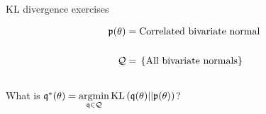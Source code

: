 
\newcommand{\TikzPtheta}[2]{
\draw[#1] (4.5, 3)  node[anchor=north] {#2};
\begin{scope}[shift={(2.5,2.5)}]
    \begin{scope}[rotate=45]
        \begin{scope}[shift={(-2.5,-2.5)}]
            \foreach \s in {0.2, 0.4, 0.6, 0.8, 1.0}
            \draw[#1] (2.5,2.5) ellipse (\s * 3 and \s * 1);
        \end{scope}
    \end{scope}
\end{scope}
}


\newcommand{\TikzPlotArea}{
\draw (0,0)--(5,0);
\foreach \x in {0,...,5}
  \draw (\x,0)--(\x,-.1) node[anchor=north]{};

\draw (0,0)--(0,5);
\foreach \y in {0,...,5}
  \draw (0,\y)--(-.1,\y) node[anchor=east] {};

\draw (0,5) node[anchor=east] {$\theta_2$};
\draw (5,0) node[anchor=north] {$\theta_1$};
}



\begin{frame}{KL divergence exercises}
\begin{minipage}{0.5\textwidth}
%
\begin{align*}
%
\p(\theta) ={}& \textrm{Correlated bivariate normal}\\ \\
%
\qdom ={}& \left\{ \textrm{All bivariate normals}\right\}\\ \\
%
\end{align*}
%
What is
$\mathfrak{q}^*(\theta) = \underset{\mathfrak{q} \in \mathcal{Q}}{\mathrm{argmin}}\, \mathrm{KL}\left(\mathfrak{q}(\theta) || \mathfrak{p}(\theta) \right)$?
%
\end{minipage}
%
\begin{minipage}{0.4\textwidth}

\end{minipage}

\end{frame}



